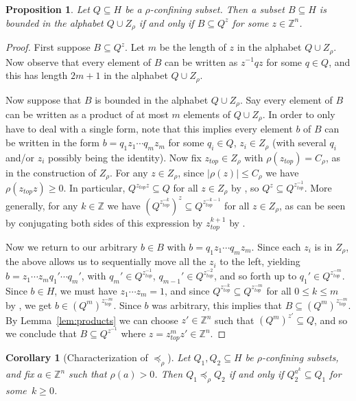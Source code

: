 \documentclass[10pt,a4paper]{article}
\newtheorem{prop}[cdrthm]{Proposition}
\newtheorem{coro}[cdrthm]{Corollary}
\theoremstyle{definition}
\theoremstyle{remark}
\newcommand{\Z}{\mathbb{Z}}
\theoremstyle{plain}
\begin{document}
\begin{prop}\label{prop:conj_is_all}
Let $Q\subseteq H$ be a $\rho$-confining subset. Then a subset $B\subseteq H$ is bounded in the alphabet $Q\cup Z_\rho$ if and only if $B \subseteq Q^z$ for some $z \in \Z^n$.
\end{prop}

\begin{proof}
First suppose $B \subseteq Q^z$. Let $m$ be the length of $z$ in the alphabet $Q\cup Z_\rho$. Now observe that every element of $B$ can be written as $z^{-1}qz$ for some $q\in Q$, and this has length $2m+1$ in the alphabet $Q\cup Z_\rho$.

Now suppose that $B$ is bounded in the alphabet $Q\cup Z_\rho$. Say every element of $B$ can be written as a product of at most $m$ elements of $Q\cup Z_\rho$. In order to only have to deal with a single form, note that this implies every element $b$ of $B$ can be written in the form $b=q_1 z_1\cdots q_m z_m$ for some $q_i\in Q$, $z_i\in Z_\rho$ (with several $q_i$ and/or $z_i$ possibly being the identity).
Now fix $z_{top}\in Z_\rho$ with $\rho(z_{top})=C_\rho$, as in the construction of $Z_\rho$. For any $z\in Z_\rho$, since $|\rho(z)|\le C_\rho$ we have $\rho(z_{top} z)\ge 0$. In particular, $Q^{z_{top} z}\subseteq Q$ for all $z\in Z_\rho$ by \StayInConf, so $Q^z\subseteq Q^{z_{top}^{-1}}$.
More generally, for any $k \in \Z$ we have $(Q^{z_{top}^{-k}})^z\subseteq Q^{z_{top}^{-k-1}}$ for all $z\in Z_\rho$, as can be seen by conjugating both sides of this expression by $z_{top}^{k+1}$ by \StayInConf.


Now we return to our arbitrary $b\in B$ with $b=q_1 z_1\cdots q_m z_m$. Since each $z_i$ is in $Z_\rho$, the above allows us to sequentially move all the $z_i$ to the left, yielding $b=z_1\cdots z_m q_1'\cdots q_m'$, with $q_m'\in Q^{z_{top}^{-1}}$, $q_{m-1}'\in Q^{z_{top}^{-2}}$, and so forth up to $q_1'\in Q^{z_{top}^{-m}}$. Since $b\in H$, we must have $z_1\cdots z_m=1$, and since $Q^{z_{top}^{-k}}\subseteq Q^{z_{top}^{-m}}$ for all $0\le k\le m$ by \StayInConf, we get $b\in (Q^m)^{z_{top}^{-m}}$. Since $b$ was arbitrary, this implies that $B\subseteq (Q^m)^{z_{top}^{-m}}$. By Lemma~\ref{lem:products} we can choose $z' \in \Z^n$ such that $(Q^m)^{z'}\subseteq Q$, and so we conclude that $B\subseteq Q^{z^{-1}}$ where $z =  z_{top}^mz' \in \Z^n$.
\end{proof}

\begin{coro}[Characterization of $\preceq_\rho$]\label{cor:conjugate}
Let $Q_1,Q_2\subseteq H$ be $\rho$-confining subsets, and fix $a \in \Z^n$ such that $\rho(a) > 0$. Then $Q_1 \preceq_\rho Q_2$ if and only if $Q_2^{a^k} \subseteq Q_1$ for some~$k \geq 0$.
\end{coro}
\end{document}
